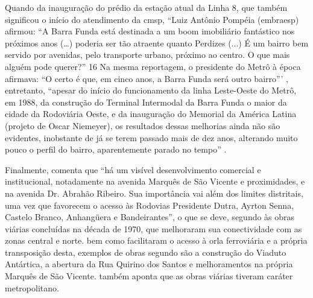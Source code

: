	Quando da inauguração do prédio da estação atual da Linha 8, que também significou o início do atendimento da \gls{cmsp}, ``Luiz Antônio Pompéia (\gls{embraesp}) afirmou: “A Barra Funda está destinada a um boom imobiliário fantástico nos próximos anos (\dots) poderia ser tão atraente
	quanto Perdizes (...) É um bairro bem servido por avenidas, pelo transporte urbano, próximo ao centro. O que mais alguém pode querer?” 16 Na mesma reportagem, o presidente do Metrô à época afirmava: ``O certo é que, em cinco anos, a Barra Funda será outro bairro''' \cite[pág. 26, com menção a Veja São Paulo, 25/11/87, pág. 24]{Brunelli}, entretanto, ``apesar do início do funcionamento da linha Leste-Oeste do Metrô, em 1988, da construção do Terminal Intermodal da Barra Funda \textemdash o maior da cidade \textemdash da Rodoviária Oeste, e da inauguração do Memorial da América Latina (projeto de Oscar Niemeyer), os resultados dessas melhorias ainda não são evidentes, inobstante de já se terem passado mais de dez anos, alterando muito pouco o perfil do bairro, aparentemente parado no tempo'' \cite[pág. 30]{Brunelli}.
	
	Finalmente,  comenta que ``há um visível desenvolvimento comercial e institucional, notadamente na avenida Marquês de São Vicente e proximidades, e na avenida Dr. Abrahão Ribeiro. Sua importância vai além dos limites distritais, uma vez que favorecem o acesso às Rodovias Presidente Dutra, Ayrton Senna, Castelo Branco, Anhangüera e Bandeirantes'', o que se deve, segundo  às obras viárias concluídas na década de 1970, que melhoraram sua conectividade com as zonas central e norte. bem como facilitaram o acesso à orla ferroviária e a própria transposição desta, exemplos de obras segundo  são a construção do Viaduto Antártica, a abertura da Rua Quirino dos Santos e melhoramentos na própria Marquês de São Vicente.  também aponta que as obras viárias tiveram caráter metropolitano.

